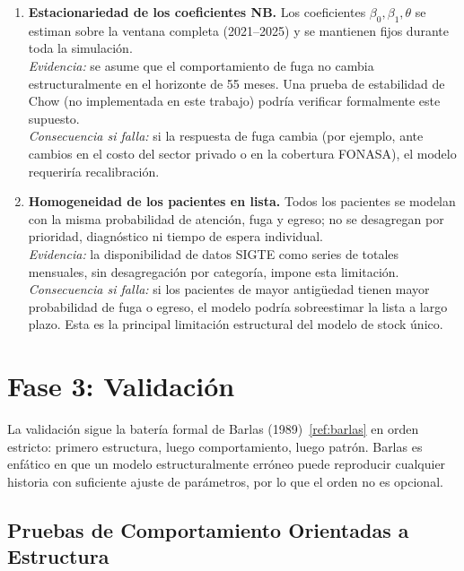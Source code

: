 \documentclass[12pt,a4paper]{article}
\begin{document}
\begin{enumerate}[leftmargin=1.5cm,label=\textbf{S\arabic*.}]
  \item \textbf{Estacionariedad de los coeficientes NB.} Los coeficientes $\beta_0, \beta_1, \theta$ se estiman sobre la ventana completa (2021--2025) y se mantienen fijos durante toda la simulación.\\
        \textit{Evidencia:} se asume que el comportamiento de fuga no cambia estructuralmente en el horizonte de 55 meses. Una prueba de estabilidad de Chow (no implementada en este trabajo) podría verificar formalmente este supuesto.\\
        \textit{Consecuencia si falla:} si la respuesta de fuga cambia (por ejemplo, ante cambios en el costo del sector privado o en la cobertura FONASA), el modelo requeriría recalibración.

  \item \textbf{Homogeneidad de los pacientes en lista.} Todos los pacientes se modelan con la misma probabilidad de atención, fuga y egreso; no se desagregan por prioridad, diagnóstico ni tiempo de espera individual.\\
        \textit{Evidencia:} la disponibilidad de datos SIGTE como series de totales mensuales, sin desagregación por categoría, impone esta limitación.\\
        \textit{Consecuencia si falla:} si los pacientes de mayor antigüedad tienen mayor probabilidad de fuga o egreso, el modelo podría sobreestimar la lista a largo plazo. Esta es la principal limitación estructural del modelo de stock único.

\end{enumerate}

\section{Fase 3: Validación}

La validación sigue la batería formal de Barlas (1989)~\ref{ref:barlas} en orden estricto: primero estructura, luego comportamiento, luego patrón. Barlas es enfático en que un modelo estructuralmente erróneo puede reproducir cualquier historia con suficiente ajuste de parámetros, por lo que el orden no es opcional.

\subsection{Pruebas de Comportamiento Orientadas a Estructura}
\end{document}
